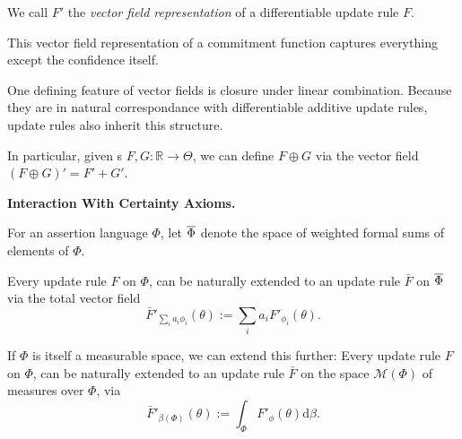 We call $F'$ the \emph{vector field representation} of a differentiable update rule $F$.

This vector field representation of a commitment function captures everything except the confidence itself. 

One defining feature of vector fields is closure under linear
combination.  Because they are in natural correspondance with differentiable additive update rules, update rules also inherit this structure.

In particular, given \cofunc s $F, G : \mathbb R \to \Theta$, we can define
$F \oplus G$ via the vector field $(F \oplus G)' = F' + G'$.

\begin{wip}
\textbf{Interaction With Certainty Axioms.}

\end{wip}

\begin{defn}
For an assertion language $\Phi$, let $\overline \Phi$ denote
the space of weighted formal sums of elements of $\Phi$.
\end{defn}

\begin{prop}
Every  update rule $F$ on $\Phi$, can be naturally extended to an update rule
$\bar F$ on $\overline \Phi$
via the total vector field
\[
    \bar F'_{\textstyle\sum_i a_i \phi_i} ( \theta ) := \sum_{i} a_i F'_{\phi_i}(\theta).
\]
%
\end{prop}

If $\Phi$ is itself a measurable space, we can extend this further:
Every  update rule $F$ on $\Phi$, can be naturally extended to an update rule $\bar F$ on the space $\mathcal M(\Phi)$ of measures over $\Phi$, via
\[
\bar F'_{\beta(\Phi)}( \theta ) := \int_{\Phi} F'_\phi(\theta) \mathrm d\beta.
\]



%
%

